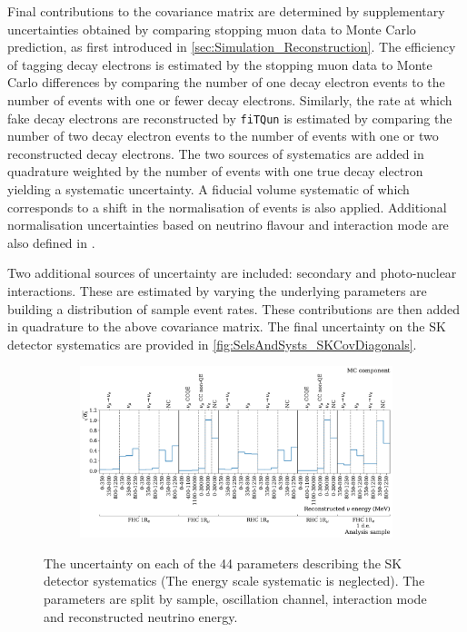 Final contributions to the covariance matrix are determined by supplementary uncertainties obtained by comparing stopping muon data to Monte Carlo prediction, as first introduced in \autoref{sec:Simulation_Reconstruction}. The efficiency of tagging decay electrons is estimated by the stopping muon data to Monte Carlo differences by comparing the number of one decay electron events to the number of events with one or fewer decay electrons. Similarly, the rate at which fake decay electrons are reconstructed by \texttt{fiTQun} is estimated by comparing the number of two decay electron events to the number of events with one or two reconstructed decay electrons. The two sources of systematics are added in quadrature weighted by the number of events with one true decay electron yielding a  systematic uncertainty.
A fiducial volume systematic of  which corresponds to a  shift in the normalisation of events is also applied. Additional normalisation uncertainties based on neutrino flavour and interaction mode are also defined in \cite{t2k_tn_399, t2k_tn_186, t2k_tn_107}.

Two additional sources of uncertainty are included: secondary and photo-nuclear interactions. These are estimated by varying the underlying parameters are building a distribution of sample event rates. These contributions are then added in quadrature to the above covariance matrix. The final uncertainty on the SK detector systematics are provided in \autoref{fig:SelsAndSysts_SKCovDiagonals}. 

\begin{figure}[h]
  \begin{subfigure}[t]{0.9\textwidth}
    \includegraphics[width=\textwidth, trim={0mm 0mm 0mm 0mm}, clip,page=1]{Figures/Selections/SK_Error_2020_Erec.pdf}
  \end{subfigure}
  \caption{The uncertainty on each of the 44 parameters describing the SK detector systematics (The energy scale systematic is neglected). The parameters are split by sample, oscillation channel, interaction mode and reconstructed neutrino energy.}
  \label{fig:SelsAndSysts_SKCovDiagonals}
\end{figure}


